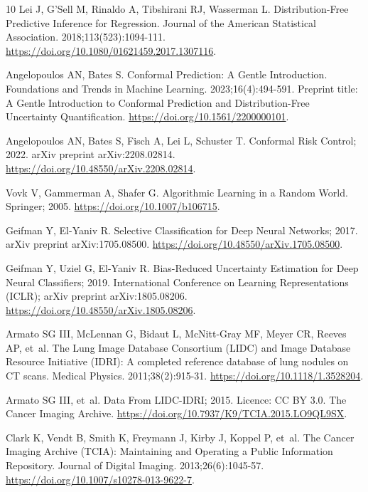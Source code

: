 \begin{thebibliography}{10}
Lei J, G'Sell M, Rinaldo A, Tibshirani RJ, Wasserman L.
\newblock Distribution-Free Predictive Inference for Regression.
\newblock Journal of the American Statistical Association.
  2018;113(523):1094-111.
\newblock \url{https://doi.org/10.1080/01621459.2017.1307116}.

Angelopoulos AN, Bates S.
\newblock Conformal Prediction: A Gentle Introduction.
\newblock Foundations and Trends in Machine Learning. 2023;16(4):494-591.
\newblock Preprint title: A Gentle Introduction to Conformal Prediction and
  Distribution-Free Uncertainty Quantification.
\newblock \url{https://doi.org/10.1561/2200000101}.

Angelopoulos AN, Bates S, Fisch A, Lei L, Schuster T. Conformal Risk Control;
  2022.
\newblock arXiv preprint arXiv:2208.02814.
\newblock \url{https://doi.org/10.48550/arXiv.2208.02814}.

Vovk V, Gammerman A, Shafer G.
\newblock Algorithmic Learning in a Random World.
\newblock Springer; 2005.
\newblock \url{https://doi.org/10.1007/b106715}.

Geifman Y, El-Yaniv R. Selective Classification for Deep Neural Networks; 2017.
\newblock arXiv preprint arXiv:1705.08500.
\newblock \url{https://doi.org/10.48550/arXiv.1705.08500}.

Geifman Y, Uziel G, El-Yaniv R. Bias-Reduced Uncertainty Estimation for Deep
  Neural Classifiers; 2019.
\newblock International Conference on Learning Representations (ICLR); arXiv
  preprint arXiv:1805.08206.
\newblock \url{https://doi.org/10.48550/arXiv.1805.08206}.

Armato SG III, McLennan G, Bidaut L, McNitt-Gray MF, Meyer CR, Reeves AP,
  et~al.
\newblock The {Lung Image Database Consortium (LIDC)} and {Image Database
  Resource Initiative (IDRI)}: A completed reference database of lung nodules
  on {CT} scans.
\newblock Medical Physics. 2011;38(2):915-31.
\newblock \url{https://doi.org/10.1118/1.3528204}.

Armato SG III, et~al. Data From {LIDC-IDRI}; 2015.
\newblock Licence: CC BY 3.0.
\newblock The Cancer Imaging Archive.
\newblock \url{https://doi.org/10.7937/K9/TCIA.2015.LO9QL9SX}.

Clark K, Vendt B, Smith K, Freymann J, Kirby J, Koppel P, et~al.
\newblock The {Cancer Imaging Archive (TCIA)}: Maintaining and Operating a
  Public Information Repository.
\newblock Journal of Digital Imaging. 2013;26(6):1045-57.
\newblock \url{https://doi.org/10.1007/s10278-013-9622-7}.


\end{thebibliography}
